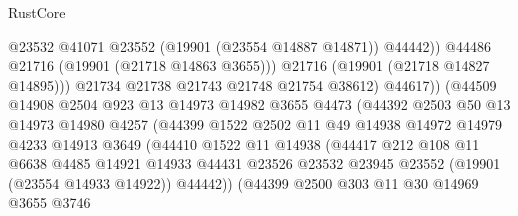 \begin{lexlean}{RustCore}
\begin{coremodule}
                                    @23532
                                    @41071
                                    @23552
                                    (@19901 (@23554 @14887 @14871))
                                    @44442))
                                @44486
                                @21716
                                (@19901 (@21718 @14863 @3655)))
                              @21716
                              (@19901 (@21718 @14827 @14895)))
                            @21734
                            @21738
                            @21743
                            @21748
                            @21754
                            @38612)
                          @44617))
                      (@44509
                        @14908
                        @2504
                        @923
                        @13
                        @14973
                        @14982
                        @3655
                        @4473
                        (@44392
                          @2503
                          @50
                          @13
                          @14973
                          @14980
                          @4257
                          (@44399
                            @1522
                            @2502
                            @11
                            @49
                            @14938
                            @14972
                            @14979
                            @4233
                            @14913
                            @3649
                            (@44410
                              @1522
                              @11
                              @14938
                              (@44417
                                @212
                                @108
                                @11
                                @6638
                                @4485
                                @14921
                                @14933
                                @44431
                                @23526
                                @23532
                                @23945
                                @23552
                                (@19901 (@23554 @14933 @14922))
                                @44442))
                            (@44399
                              @2500
                              @303
                              @11
                              @30
                              @14969
                              @3655
                              @3746

\end{coremodule}
\end{lexlean}
